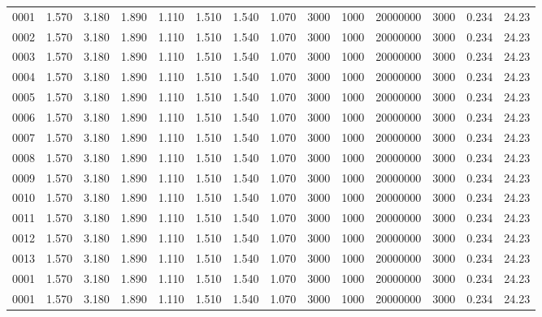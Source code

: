 \documentclass[paper=a4, parskip, fontsize=11pt]{scrartcl}
\begin{document}
\begin{center}
\begin{longtable}{lrrrrrrrrrrrrr}
    		0001 &    1.570 &    3.180 & 1.890 &    1.110 &    1.510 &    1.540 &    1.070 &   3000  & 1000 &  20000000 & 3000 & 0.234 & 24.23 \\
    		0002 &    1.570 &    3.180 & 1.890 &    1.110 &    1.510 &    1.540 &    1.070 &   3000  & 1000 &  20000000 & 3000 & 0.234 & 24.23 \\
    		0003 &    1.570 &    3.180 & 1.890 &    1.110 &    1.510 &    1.540 &    1.070 &   3000  & 1000 &  20000000 & 3000 & 0.234 & 24.23 \\
    		0004 &    1.570 &    3.180 & 1.890 &    1.110 &    1.510 &    1.540 &    1.070 &   3000  & 1000 &  20000000 & 3000 & 0.234 & 24.23 \\
    		0005 &    1.570 &    3.180 & 1.890 &    1.110 &    1.510 &    1.540 &    1.070 &   3000  & 1000 &  20000000 & 3000 & 0.234 & 24.23 \\
    		0006 &    1.570 &    3.180 & 1.890 &    1.110 &    1.510 &    1.540 &    1.070 &   3000  & 1000 &  20000000 & 3000 & 0.234 & 24.23 \\
    		0007 &    1.570 &    3.180 & 1.890 &    1.110 &    1.510 &    1.540 &    1.070 &   3000  & 1000 &  20000000 & 3000 & 0.234 & 24.23 \\
    		0008 &    1.570 &    3.180 & 1.890 &    1.110 &    1.510 &    1.540 &    1.070 &   3000  & 1000 &  20000000 & 3000 & 0.234 & 24.23 \\
    		0009 &    1.570 &    3.180 & 1.890 &    1.110 &    1.510 &    1.540 &    1.070 &   3000  & 1000 &  20000000 & 3000 & 0.234 & 24.23 \\
    		0010 &    1.570 &    3.180 & 1.890 &    1.110 &    1.510 &    1.540 &    1.070 &   3000  & 1000 &  20000000 & 3000 & 0.234 & 24.23 \\
    		0011 &    1.570 &    3.180 & 1.890 &    1.110 &    1.510 &    1.540 &    1.070 &   3000  & 1000 &  20000000 & 3000 & 0.234 & 24.23 \\
    		0012 &    1.570 &    3.180 & 1.890 &    1.110 &    1.510 &    1.540 &    1.070 &   3000  & 1000 &  20000000 & 3000 & 0.234 & 24.23 \\
    		0013 &    1.570 &    3.180 & 1.890 &    1.110 &    1.510 &    1.540 &    1.070 &   3000  & 1000 &  20000000 & 3000 & 0.234 & 24.23 \\
    		0001 &    1.570 &    3.180 & 1.890 &    1.110 &    1.510 &    1.540 &    1.070 &   3000  & 1000 &  20000000 & 3000 & 0.234 & 24.23 \\
    		0001 &    1.570 &    3.180 & 1.890 &    1.110 &    1.510 &    1.540 &    1.070 &   3000  & 1000 &  20000000 & 3000 & 0.234 & 24.23 \\

\end{longtable}
\end{center}
\end{document}
